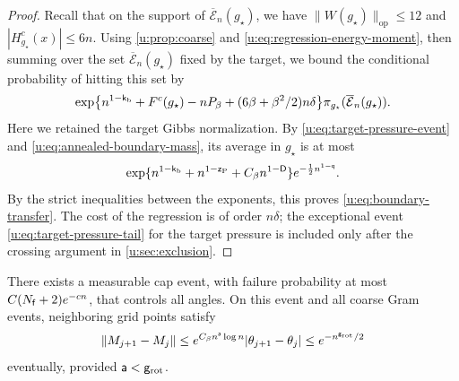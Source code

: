 \begin{proof}
Recall that on the support of $\overline{\mathcal E}_n(g_\star)$, we have
$\|W(g_\star)\|_{\mathrm{op}}\le12$ and $|H^c_{g_\star}(x)|\le6n$.
Using \cref{u:prop:coarse} and \eqref{u:eq:regression-energy-moment}, then
summing over the set $\overline{\mathcal E}_n(g_\star)$ fixed by the target,
we bound the conditional probability of hitting this set by
\[
 \exp\bigl\{n^{1-\mathsf{k}_{\rm b}}+F^c(g_\star)-nP_\beta
                    +(6\beta+\beta^2/2)n\delta\bigr\}
             \pi_{g_\star}(\overline{\mathcal E}_n(g_\star)).
\]
Here we retained the target Gibbs normalization. By
\eqref{u:eq:target-pressure-event} and
\eqref{u:eq:annealed-boundary-mass}, its average in $g_\star$ is at most
\[
 \exp\{n^{1-\mathsf{k}_{\rm b}}+n^{1-\mathsf{z}_{\rm P}}
                   +C_\beta n^{1-\mathsf{D}}\}
                         e^{-\frac12 n^{1-\mathsf{q}}}.
\]
By the strict inequalities between the exponents, this proves
\eqref{u:eq:boundary-transfer}. The cost of the regression is of order
$n\delta$; the exceptional event \eqref{u:eq:target-pressure-tail} for the
target pressure is included only after the crossing
argument in \cref{u:sec:exclusion}.
\end{proof}

\begin{lemma}\label{u:lem:stability}
There exists a measurable cap event, with failure probability at most
$C(N_{\mathsf{f}}+2)e^{-cn}$, that controls all angles. On this event and all
coarse Gram events, neighboring grid points satisfy
\begin{equation}\label{u:eq:coarse-continuity}
 \lVert M_{j+1}-M_j\rVert
 \le e^{C_\beta n^{\mathsf{a}}\log n}|\theta_{j+1}-\theta_j|
 \le e^{-n^{\mathsf{g}_{\rm rot}}/2}
\end{equation}
eventually, provided $\mathsf{a}<\mathsf{g}_{\rm rot}$.
\end{lemma}

